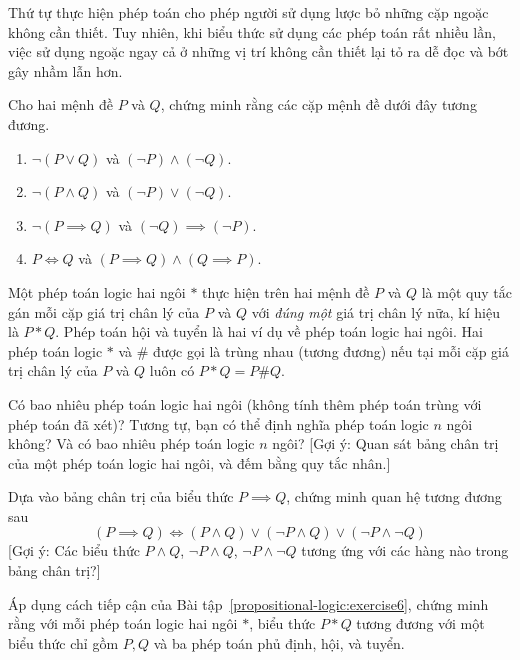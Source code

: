 Thứ tự thực hiện phép toán cho phép người sử dụng lược bỏ những cặp ngoặc không cần thiết. Tuy nhiên, khi biểu thức sử dụng các phép toán rất nhiều lần, việc sử dụng ngoặc ngay cả ở những vị trí không cần thiết lại tỏ ra dễ đọc và bớt gây nhầm lẫn hơn.

\begin{exercise}\label{propositional-logic:exercise4}
    Cho hai mệnh đề $P$ và $Q$, chứng minh rằng các cặp mệnh đề dưới đây tương đương.
    \begin{enumerate}[label={(\alph*)},itemsep=0pt]
        \item $\neg (P\vee Q)$ và $(\neg P) \wedge (\neg Q)$.
        \item $\neg (P\wedge Q)$ và $(\neg P)\vee (\neg Q)$.
        \item $\neg (P\implies Q)$ và $(\neg Q)\implies (\neg P)$.
        \item $P\Leftrightarrow Q$ và $(P\implies Q) \wedge (Q\implies P)$.
    \end{enumerate}
\end{exercise}

\begin{exercise}\label{propositional-logic:exercise5}
    Một phép toán logic hai ngôi $*$ thực hiện trên hai mệnh đề $P$ và $Q$ là một quy tắc gán mỗi cặp giá trị chân lý của $P$ và $Q$ với \textit{đúng một} giá trị chân lý nữa, kí hiệu là $P * Q$. Phép toán hội và tuyển là hai ví dụ về phép toán logic hai ngôi. Hai phép toán logic $*$ và $\#$ được gọi là trùng nhau (tương đương) nếu tại mỗi cặp giá trị chân lý của $P$ và $Q$ luôn có $P * Q = P\# Q$.

    Có bao nhiêu phép toán logic hai ngôi (không tính thêm phép toán trùng với phép toán đã xét)? Tương tự, bạn có thể định nghĩa phép toán logic $n$ ngôi không? Và có bao nhiêu phép toán logic $n$ ngôi? [Gợi ý: Quan sát bảng chân trị của một phép toán logic hai ngôi, và đếm bằng quy tắc nhân.]
\end{exercise}

\begin{exercise}\label{propositional-logic:exercise6}
    Dựa vào bảng chân trị của biểu thức $P\implies Q$, chứng minh quan hệ tương đương sau
    \[
        (P\implies Q) \Leftrightarrow (P\wedge Q)\vee (\neg P\wedge Q) \vee (\neg P\wedge \neg Q)
    \]
    [Gợi ý: Các biểu thức $P\wedge Q$, $\neg P\wedge Q$, $\neg P\wedge \neg Q$ tương ứng với các hàng nào trong bảng chân trị?]
\end{exercise}

\begin{exercise}\label{propositional-logic:exercise7}
    Áp dụng cách tiếp cận của Bài tập~\ref{propositional-logic:exercise6}, chứng minh rằng với mỗi phép toán logic hai ngôi $*$, biểu thức $P * Q$ tương đương với một biểu thức chỉ gồm $P, Q$ và ba phép toán phủ định, hội, và tuyển.
\end{exercise}

